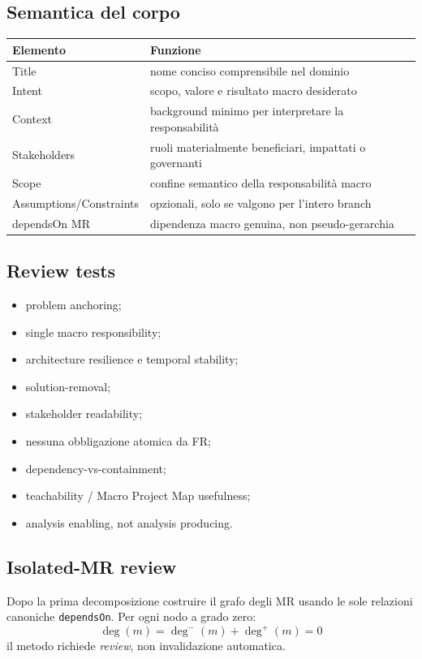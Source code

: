 \documentclass[11pt,a4paper]{article}
\begin{document}
\subsection{Semantica del corpo}
\begin{longtable}{p{}p{}}
\toprule
Elemento & Funzione \\\midrule\endhead
Title & nome conciso comprensibile nel dominio \\
Intent & scopo, valore e risultato macro desiderato \\
Context & background minimo per interpretare la responsabilità \\
Stakeholders & ruoli materialmente beneficiari, impattati o governanti \\
Scope & confine semantico della responsabilità macro \\
Assumptions/\allowbreak Constraints & opzionali, solo se valgono per l'intero branch \\
dependsOn MR & dipendenza macro genuina, non pseudo-gerarchia \\
\bottomrule
\end{longtable}

\subsection{Review tests}
\begin{itemize}
\item problem anchoring;
\item single macro responsibility;
\item architecture resilience e temporal stability;
\item solution-removal;
\item stakeholder readability;
\item nessuna obbligazione atomica da FR;
\item dependency-vs-containment;
\item teachability / Macro Project Map usefulness;
\item analysis enabling, not analysis producing.
\end{itemize}

\subsection{Isolated-MR review}
Dopo la prima decomposizione costruire il grafo degli MR usando le sole relazioni canoniche \texttt{dependsOn}. Per ogni nodo a grado zero:
\[
\deg(m)=\deg^{-}(m)+\deg^{+}(m)=0
\]
il metodo richiede \emph{review}, non invalidazione automatica.
\end{document}
